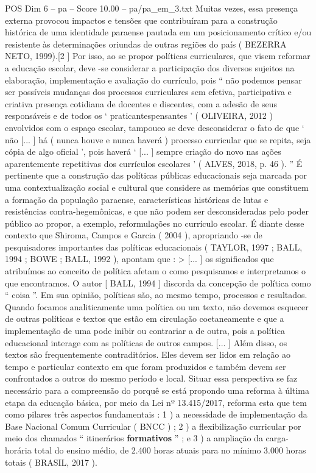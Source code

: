 \begin{textsample}{POS Dim 6 – pa – Score 10.00 – pa/pa\_em\_3.txt}
Muitas vezes, essa presença externa provocou impactos e tensões que contribuíram para a construção histórica de uma identidade paraense pautada em um posicionamento crítico e/ou resistente às determinações oriundas de outras regiões do país ( BEZERRA NETO, 1999).[2 ] Por isso, ao se propor políticas curriculares, que visem reformar a educação escolar, deve -se considerar a participação dos diversos sujeitos na elaboração, implementação e avaliação do currículo, pois “ não podemos pensar ser possíveis mudanças dos processos curriculares sem efetiva, participativa e criativa presença cotidiana de docentes e discentes, com a adesão de seus responsáveis e de todos os ‘ praticantespensantes ’ ( OLIVEIRA, 2012 ) envolvidos com o espaço escolar, tampouco se deve desconsiderar o fato de que ‘ não [... ] há ( nunca houve e nunca haverá ) processo curricular que se repita, seja cópia de algo oficial ’, pois haverá ‘ [... ] sempre criação do novo nas ações aparentemente repetitivas dos currículos escolares ’ ( ALVES, 2018, p. 46 ). ” É pertinente que a construção das políticas públicas educacionais seja marcada por uma contextualização social e cultural que considere as memórias que constituem a formação da população paraense, características históricas de lutas e resistências contra-hegemônicas, e que não podem ser desconsideradas pelo poder público ao propor, a exemplo, reformulações no currículo escolar.
É diante desse contexto que Shiroma, Campos e Garcia ( 2004 ), apropriando -se de pesquisadores importantes das políticas educacionais ( TAYLOR, 1997 ; BALL, 1994 ; BOWE ; BALL, 1992 ), apontam que : > [... ] os significados que atribuímos ao conceito de política afetam o como pesquisamos e interpretamos o que encontramos.
O autor [ BALL, 1994 ] discorda da concepção de política como “ coisa ”.
Em sua opinião, políticas são, ao mesmo tempo, processos e resultados.
Quando focamos analiticamente uma política ou um texto, não devemos esquecer de outras políticas e textos que estão em circulação coetaneamente e que a implementação de uma pode inibir ou contrariar a de outra, pois a política educacional interage com as políticas de outros campos. [... ] Além disso, os textos são frequentemente contraditórios.
Eles devem ser lidos em relação ao tempo e particular contexto em que foram produzidos e também devem ser confrontados a outros do mesmo período e local.
Situar essa perspectiva se faz necessário para a compreensão do porquê se está propondo uma reforma à última etapa da educação básica, por meio da Lei nº 13.415/2017, reforma esta que tem como pilares três aspectos fundamentais : 1 ) a necessidade de implementação da Base Nacional Comum Curricular ( BNCC ) ; 2 ) a flexibilização curricular por meio dos chamados “ itinerários \textbf{formativos} ” ; e 3 ) a ampliação da carga-horária total do ensino médio, de 2.400 horas atuais para no mínimo 3.000 horas totais ( BRASIL, 2017 ).

\end{textsample}

